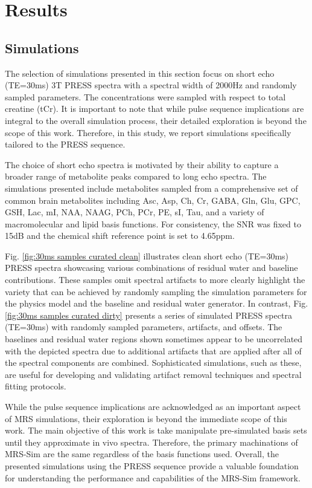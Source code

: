 \section{Results}\label{sec:Results}

\subsection{Simulations}

The selection of simulations presented in this section focus on short echo (TE=30ms) 3T PRESS spectra with a spectral width of 2000Hz and randomly sampled parameters. The concentrations were sampled with respect to total creatine (tCr). It is important to note that while pulse sequence implications are integral to the overall simulation process, their detailed exploration is beyond the scope of this work. Therefore, in this study, we report simulations specifically tailored to the PRESS sequence.

The choice of short echo spectra is motivated by their ability to capture a broader range of metabolite peaks compared to long echo spectra. The simulations presented include metabolites sampled from a comprehensive set of common brain metabolites including Asc, Asp, Ch, Cr, GABA, Gln, Glu, GPC, GSH, Lac, mI, NAA, NAAG, PCh, PCr, PE, sI, Tau, and a variety of macromolecular and lipid basis functions. For consistency, the SNR was fixed to 15dB and the chemical shift reference point is set to 4.65ppm.

Fig. \ref{fig:30ms samples curated clean} illustrates clean short echo (TE=30ms) PRESS spectra showcasing various combinations of residual water and baseline contributions. These samples omit spectral artifacts to more clearly highlight the variety that can be achieved by randomly sampling the simulation parameters for the physics model and the baseline and residual water generator. In contrast, Fig. \ref{fig:30ms samples curated dirty} presents a series of simulated PRESS spectra (TE=30ms) with randomly sampled parameters, artifacts, and offsets. The baselines and residual water regions shown sometimes appear to be uncorrelated with the depicted spectra due to additional artifacts that are applied after all of the spectral components are combined. Sophisticated simulations, such as these, are useful for developing and validating artifact removal techniques and spectral fitting protocols.  


While the pulse sequence implications are acknowledged as an important aspect of MRS simulations, their exploration is beyond the immediate scope of this work. The main objective of this work is take manipulate pre-simulated basis sets until they approximate in vivo spectra. Therefore, the primary machinations of MRS-Sim are the same regardless of the basis functions used. Overall, the presented simulations using the PRESS sequence provide a valuable foundation for understanding the performance and capabilities of the MRS-Sim framework.
